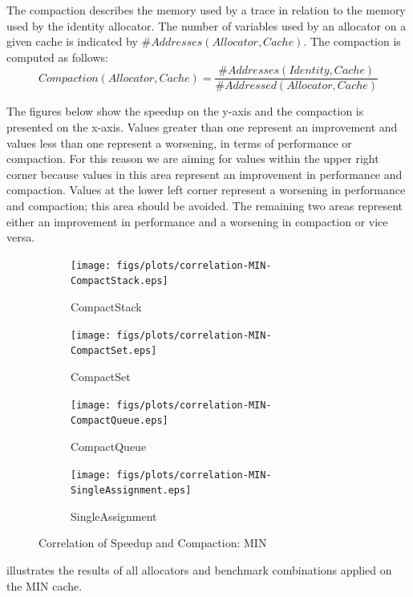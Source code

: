 \documentclass[onecolumn, openright, master, english, signatures]{dbrgrptt}
\begin{document}
The compaction describes the memory used by a \ac{trace} in relation to the memory used by the identity allocator.
The number of variables used by an allocator on a given cache is indicated by $\#Addresses(Allocator, Cache)$.
The compaction is computed as follows:
$$%
Compaction(Allocator, Cache) = \frac{\#Addresses(Identity, Cache)}{\#Addressed(Allocator, Cache)}
$$

The figures below show the speedup on the y-axis and the compaction is presented on the x-axis.
Values greater than one represent an improvement and values less than one represent a worsening, in terms of performance or compaction.
For this reason we are aiming for values within the upper right corner because values in this area represent an improvement in performance and compaction.
Values at the lower left corner represent a worsening in performance and compaction; this area should be avoided.
The remaining two areas represent either an improvement in performance and a worsening in compaction or vice versa.

\begin{figure}[!ht]
  \begin{subfigure}[b]{0.5\textwidth}%
    \texttt{[image: figs/plots/correlation-MIN-CompactStack.eps]}
    \caption{CompactStack}
    \label{fig:correlation-min-compactstack}
  \end{subfigure}%
  \begin{subfigure}[b]{0.5\textwidth}%
    \texttt{[image: figs/plots/correlation-MIN-CompactSet.eps]}
    \caption{CompactSet}
    \label{fig:correlation-min-compactset}
  \end{subfigure}%
  \qquad
  \begin{subfigure}[b]{0.5\textwidth}%
    \texttt{[image: figs/plots/correlation-MIN-CompactQueue.eps]}
    \caption{CompactQueue}
    \label{fig:correlation-min-compactqueue}
  \end{subfigure}%
  \begin{subfigure}[b]{0.5\textwidth}%
    \texttt{[image: figs/plots/correlation-MIN-SingleAssignment.eps]}
    \caption{SingleAssignment}
    \label{fig:correlation-min-singleassignment}
  \end{subfigure}%
  \caption{Correlation of Speedup and Compaction: \ac{MIN}}
  \label{fig:correlation-min}
\end{figure}

 illustrates the results of all allocators and benchmark combinations applied on the \ac{MIN} cache.
\end{document}
